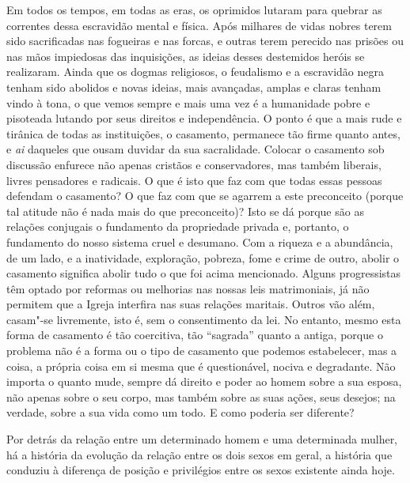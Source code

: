 Em todos os tempos, em todas as eras, os oprimidos lutaram para quebrar
as correntes dessa escravidão mental e física. Após milhares de vidas
nobres terem sido sacrificadas nas fogueiras e nas forcas, e outras
terem perecido nas prisões ou nas mãos impiedosas das inquisições, as
ideias desses destemidos heróis se realizaram. Ainda que os
dogmas religiosos, o feudalismo e a escravidão negra tenham sido abolidos e
novas ideias, mais avançadas, amplas e claras tenham vindo à tona, o que vemos
sempre e mais uma vez é a humanidade pobre e pisoteada lutando por seus
direitos e independência. O ponto é que a mais rude e tirânica de todas
as instituições, o casamento, permanece tão firme quanto antes, e \textit{ai}
daqueles que ousam duvidar da sua sacralidade. Colocar o casamento sob
discussão enfurece não apenas cristãos e conservadores, mas também
liberais, livres pensadores e radicais. O que é isto que faz com que
todas essas pessoas defendam o casamento? O que faz com que se agarrem a
este preconceito (porque tal atitude não é nada mais do que
preconceito)? Isto se dá porque são as relações conjugais o fundamento
da propriedade privada e, portanto, o fundamento do nosso sistema cruel
e desumano. Com a riqueza e a abundância, de um lado, e a inatividade,
exploração, pobreza, fome e crime de outro, abolir o casamento significa
abolir tudo o que foi acima mencionado. Alguns progressistas têm optado
por reformas ou melhorias nas nossas leis matrimoniais, já não permitem
que a Igreja interfira nas suas relações maritais. Outros vão além,
casam"-se livremente, isto é, sem o consentimento da lei. No entanto,
mesmo esta forma de casamento é tão coercitiva, tão ``sagrada'' quanto
a antiga, porque o problema não é a forma ou o tipo de casamento que
podemos estabelecer, mas a coisa, a própria coisa em si mesma que é
questionável, nociva e degradante. Não importa o quanto mude, sempre dá
direito e poder ao homem sobre a sua esposa, não apenas sobre o seu corpo,
mas também sobre as suas ações, seus desejos; na verdade, sobre a sua vida
como um todo. E como poderia ser diferente?

Por detrás da relação entre um determinado homem e uma determinada
mulher, há a história da evolução da relação entre os dois sexos em
geral, a história que conduziu à diferença de posição e privilégios
entre os sexos existente ainda hoje.

